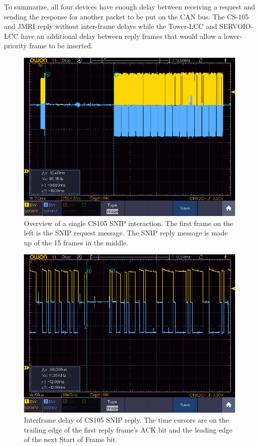 \documentclass[11pt]{article}
\begin{document}
To summarize, all four devices have enough delay 
between receiving a request and sending the response
for another packet to be put on the CAN bus. The CS-105 and JMRI 
reply without inter-frame delays while the Tower-LCC and SERVOIO-LCC
have an additional delay between reply frames that would
allow a lower-priority frame to be inserted.

\begin{figure}[!htbp]
\centering
\includegraphics[width=1.0\linewidth]{1SNIP_CS105_Full}
\caption{Overview of a single CS105 SNIP interaction. 
The first frame on the left is the SNIP request message.
The SNIP reply message is made up of the 15 frames in the middle.}
\label{fig:single_CS105_SNIP_interaction}
\end{figure}

\begin{figure}[!htbp]
\centering
\includegraphics[width=1.0\linewidth]{1SNIP_CS105_Spacing}
\caption{Interframe delay of CS105 SNIP reply. 
The time cursors are on the trailing edge of the first reply frame's ACK bit 
and the leading edge of the next Start of Frame bit.}
\label{fig:single_CS105_SNIP_interframe}
\end{figure}
\end{document}
